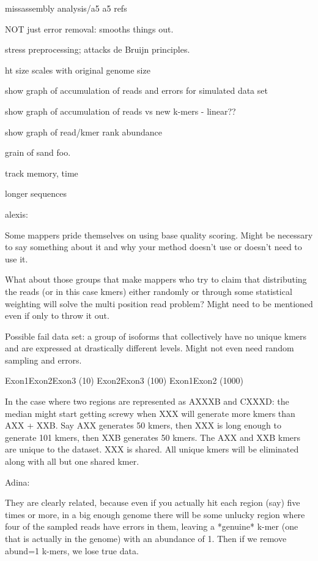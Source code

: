 \documentclass[10pt]{article}
\begin{document}
missassembly analysis/a5
a5 refs

NOT just error removal: smooths things out.

stress preprocessing; attacks de Bruijn principles.

ht size scales with original genome size

show graph of accumulation of reads and errors for simulated data set

show graph of accumulation of reads vs new k-mers - linear??

show graph of read/kmer rank abundance

grain of sand foo.


track memory, time

longer sequences

alexis:

Some mappers pride themselves on using base quality scoring.  Might be
necessary to say something about it and why your method doesn't use or
doesn't need to use it.

What about those groups that make mappers who try to claim that
distributing the reads (or in this case kmers) either randomly or
through some statistical weighting will solve the multi position read
problem?  Might need to be mentioned even if only to throw it out.

Possible fail data set: a group of isoforms that collectively have no
unique kmers and are expressed at drastically different levels.  Might
not even need random sampling and errors.

Exon1Exon2Exon3 (10)
Exon2Exon3                (100)
Exon1Exon2             (1000)

In the case where two regions are represented as AXXXB and CXXXD: the
median might start getting screwy when XXX will generate more kmers
than AXX + XXB.  Say AXX generates 50 kmers, then XXX is long enough
to generate 101 kmers, then XXB generates 50 kmers.  The AXX and XXB
kmers are unique to the dataset.  XXX is shared.  All unique kmers
will be eliminated along with all but one shared kmer.

Adina:

They are clearly related, because even if you actually hit each region
(say) five times or more, in a big enough genome there will be some
unlucky region where four of the sampled reads have errors in them,
leaving a *genuine* k-mer (one that is actually in the genome) with an
abundance of 1. Then if we remove abund=1 k-mers, we lose true data.
\end{document}
